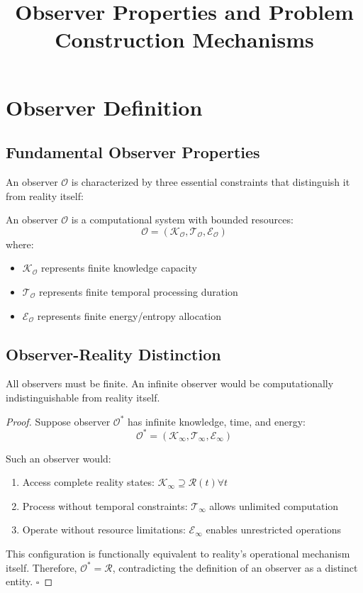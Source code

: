 \documentclass{article}
\title{Observer Properties and Problem Construction Mechanisms}
\author{}
\date{}
\begin{document}
\maketitle

\section{Observer Definition}

\subsection{Fundamental Observer Properties}
An observer $\mathcal{O}$ is characterized by three essential constraints that distinguish it from reality itself:

\begin{definition}
An observer $\mathcal{O}$ is a computational system with bounded resources:
$$\mathcal{O} = (\mathcal{K}_{\mathcal{O}}, \mathcal{T}_{\mathcal{O}}, \mathcal{E}_{\mathcal{O}})$$
where:
\begin{itemize}
    \item $\mathcal{K}_{\mathcal{O}}$ represents finite knowledge capacity
    \item $\mathcal{T}_{\mathcal{O}}$ represents finite temporal processing duration  
    \item $\mathcal{E}_{\mathcal{O}}$ represents finite energy/entropy allocation
\end{itemize}
\end{definition}

\subsection{Observer-Reality Distinction}
\begin{theorem}
All observers must be finite. An infinite observer would be computationally indistinguishable from reality itself.
\end{theorem}

\begin{proof}
Suppose observer $\mathcal{O}^*$ has infinite knowledge, time, and energy:
$$\mathcal{O}^* = (\mathcal{K}_{\infty}, \mathcal{T}_{\infty}, \mathcal{E}_{\infty})$$

Such an observer would:
\begin{enumerate}
    \item Access complete reality states: $\mathcal{K}_{\infty} \supseteq \mathcal{R}(t) \forall t$
    \item Process without temporal constraints: $\mathcal{T}_{\infty}$ allows unlimited computation
    \item Operate without resource limitations: $\mathcal{E}_{\infty}$ enables unrestricted operations
\end{enumerate}

This configuration is functionally equivalent to reality's operational mechanism itself. Therefore, $\mathcal{O}^* = \mathcal{R}$, contradicting the definition of an observer as a distinct entity. $\square$
\end{proof}
\end{document}
